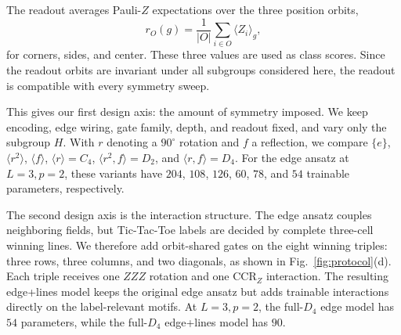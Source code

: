The readout averages Pauli-$Z$ expectations over the three
position orbits,
\[
r_O(g)=\frac{1}{|O|}\sum_{i\in O}\langle Z_i\rangle_g ,
\]
for corners, sides, and center. These three values are used as
class scores. Since the readout orbits are invariant under all
subgroups considered here, the readout is compatible with every
symmetry sweep.

This gives our first design axis: the amount of symmetry imposed.
We keep encoding, edge wiring, gate family, depth, and readout
fixed, and vary only the subgroup $H$. With $r$ denoting a
$90^\circ$ rotation and $f$ a reflection, we compare
$\{e\}$, $\langle r^2\rangle$, $\langle f\rangle$,
$\langle r\rangle=C_4$, $\langle r^2,f\rangle=D_2$, and
$\langle r,f\rangle=D_4$. For the edge ansatz at $L=3,p=2$,
these variants have $204$, $108$, $126$, $60$, $78$, and $54$
trainable parameters, respectively.

The second design axis is the interaction structure. The edge
ansatz couples neighboring fields, but Tic-Tac-Toe labels are
decided by complete three-cell winning lines. We therefore add
orbit-shared gates on the eight winning triples: three rows,
three columns, and two diagonals, as shown in
Fig.~\ref{fig:protocol}(d). Each triple receives one $ZZZ$ rotation
and one $\mathrm{CCR}_Z$ interaction. The resulting edge+lines
model keeps the original edge ansatz but adds trainable
interactions directly on the label-relevant motifs. At
$L=3,p=2$, the full-$D_4$ edge model has $54$ parameters, while
the full-$D_4$ edge+lines model has $90$.

